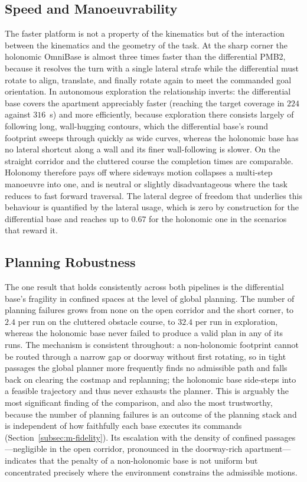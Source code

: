 \subsection{Speed and Manoeuvrability}
\label{subsec:disc-speed}

The faster platform is not a property of the kinematics but of the interaction between the kinematics and the geometry of the task. At the sharp corner the holonomic OmniBase is almost three times faster than the differential PMB2, because it resolves the turn with a single lateral strafe while the differential must rotate to align, translate, and finally rotate again to meet the commanded goal orientation. In autonomous exploration the relationship inverts: the differential base covers the apartment appreciably faster (reaching the target coverage in $224$ against $316$~s) and more efficiently, because exploration there consists largely of following long, wall-hugging contours, which the differential base's round footprint sweeps through quickly as wide curves, whereas the holonomic base has no lateral shortcut along a wall and its finer wall-following is slower. On the straight corridor and the cluttered course the completion times are comparable. Holonomy therefore pays off where sideways motion collapses a multi-step manoeuvre into one, and is neutral or slightly disadvantageous where the task reduces to fast forward traversal. The lateral degree of freedom that underlies this behaviour is quantified by the lateral usage, which is zero by construction for the differential base and reaches up to $0.67$ for the holonomic one in the scenarios that reward it.

\subsection{Planning Robustness}
\label{subsec:disc-robustness}

The one result that holds consistently across both pipelines is the differential base's fragility in confined spaces at the level of global planning. The number of planning failures grows from none on the open corridor and the short corner, to $2.4$ per run on the cluttered obstacle course, to $32.4$ per run in exploration, whereas the holonomic base never failed to produce a valid plan in any of its runs. The mechanism is consistent throughout: a non-holonomic footprint cannot be routed through a narrow gap or doorway without first rotating, so in tight passages the global planner more frequently finds no admissible path and falls back on clearing the costmap and replanning; the holonomic base side-steps into a feasible trajectory and thus never exhausts the planner. This is arguably the most significant finding of the comparison, and also the most trustworthy, because the number of planning failures is an outcome of the planning stack and is independent of how faithfully each base executes its commands (Section~\ref{subsec:m-fidelity}). Its escalation with the density of confined passages---negligible in the open corridor, pronounced in the doorway-rich apartment---indicates that the penalty of a non-holonomic base is not uniform but concentrated precisely where the environment constrains the admissible motions.

